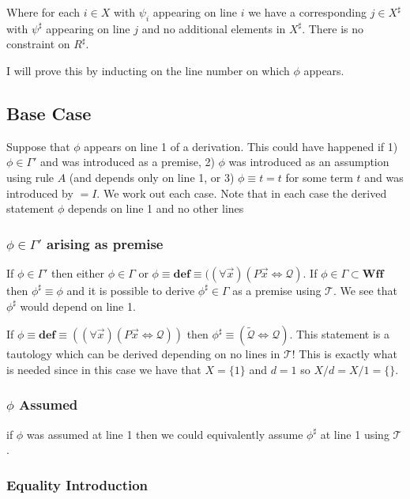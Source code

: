 \documentclass[12pt]{article}
\newcommand{\bv}[1]{\boldsymbol{#1}}
\newcommand{\mc}[1]{\mathcal{#1}}
\newcommand{\bc}[1]{\bv{\mc{#1}}}
\begin{document}
Where for each $i\in X$ with $\psi_i$ appearing on line $i$ we have a corresponding $j \in X^{\sharp}$ with $\psi^{\sharp}$ appearing on line $j$ and no additional elements in $X^{\sharp}$. There is no constraint on $R^{\sharp}$.

I will prove this by inducting on the line number on which $\phi$ appears.

\subsection*{Base Case}

Suppose that $\phi$ appears on line 1 of a derivation. This could have happened if 1) $\phi \in \Gamma'$ and was introduced as a premise, 2) $\phi$ was introduced as an assumption using rule $A$ (and depends only on line 1, or 3) $\phi \equiv t=t$ for some term $t$ and was introduced by $=I$. We work out each case. Note that in each case the derived statement $\phi$ depends on line 1 and no other lines

\subsubsection*{$\phi \in \Gamma'$ arising as premise}

If $\phi \in \Gamma'$ then either $\phi \in \Gamma$ or $\phi \equiv \textbf{def} \equiv ((\forall \vec{x})(P\vec{x} \Leftrightarrow \mc{Q})$. If $\phi \in \Gamma \subset \textbf{Wff}$ then $\phi^{\sharp} \equiv \phi$ and it is possible to derive $\phi^{\sharp} \in \Gamma$ as a premise using $\bc{T}$. We see that $\phi^{\sharp}$ would depend on line 1.

If $\phi\equiv \textbf{def}\equiv ((\forall \vec{x})(P\vec{x}\Leftrightarrow \mc{Q}))$ then $\phi^{\sharp} \equiv (\tilde{\mc{Q}}\iff\mc{Q})$. This statement is a tautology which can be derived depending on no lines in $\mc{T}$! This is exactly what is needed since in this case we have that $X=\{1\}$ and $d=1$ so $X/d = X/1 = \{\}$.

\subsubsection*{$\phi$ Assumed}

if $\phi$ was assumed at line 1 then we could equivalently assume $\phi^{\sharp}$ at line 1 using $\bc{T}$.

\subsubsection*{Equality Introduction}
\end{document}

